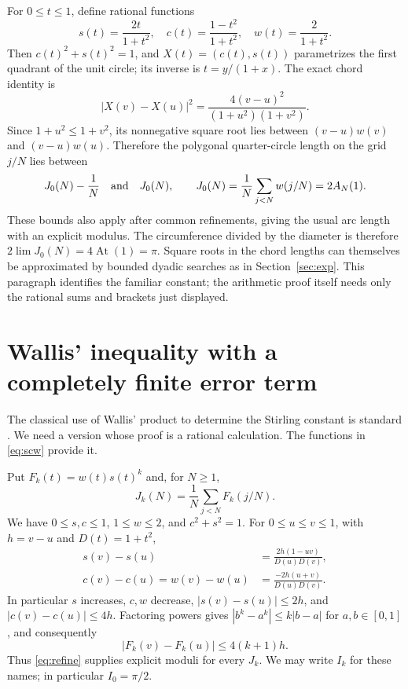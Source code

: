 \documentclass[11pt]{article}
\theoremstyle{definition}
\newcommand{\abs}[1]{\left|#1\right|}
\newcommand{\At}{\operatorname{At}}
\begin{document}
For $0\le t\le1$, define rational functions
\begin{equation}\label{eq:scw}
 s(t)=\frac{2t}{1+t^2},\quad
 c(t)=\frac{1-t^2}{1+t^2},\quad
 w(t)=\frac2{1+t^2}.
\end{equation}
Then $c(t)^2+s(t)^2=1$, and $X(t)=(c(t),s(t))$ parametrizes the
first quadrant of the unit circle; its inverse is $t=y/(1+x)$.
The exact chord identity is
\[
 \abs{X(v)-X(u)}^2
 =\frac{4(v-u)^2}{(1+u^2)(1+v^2)}.
\]
Since $1+u^2\le1+v^2$, its nonnegative square root lies between
$(v-u)w(v)$ and $(v-u)w(u)$. Therefore the polygonal quarter-circle
length on the grid $j/N$ lies between
\[
 J_0(N)-\frac1N\quad\hbox{and}\quad J_0(N),\qquad
 J_0(N)=\frac1N\sum_{j<N}w(j/N)=2A_N(1).
\]
These bounds also apply after common refinements, giving the usual arc
length with an explicit modulus. The circumference divided by the
diameter is therefore $2\lim J_0(N)=4\At(1)=\pi$.
Square roots in the chord lengths can themselves be approximated by
bounded dyadic searches as in Section~\ref{sec:exp}. This paragraph
identifies the familiar constant; the arithmetic proof itself needs only
the rational sums and brackets just displayed.

\section{Wallis' inequality with a completely finite error term}
\label{sec:wallis}

The classical use of Wallis' product to determine the Stirling constant is
standard \cite{Bruin}. We need a version whose proof is a rational
calculation. The functions in \eqref{eq:scw} provide it.

Put $F_k(t)=w(t)s(t)^k$ and, for $N\ge1$,
\begin{equation}\label{eq:J}
 J_k(N)=\frac1N\sum_{j<N}F_k(j/N).
\end{equation}
We have $0\le s,c\le1$, $1\le w\le2$, and $c^2+s^2=1$.
For $0\le u\le v\le1$, with $h=v-u$ and $D(t)=1+t^2$,
\begin{align}
 s(v)-s(u)&=\frac{2h(1-uv)}{D(u)D(v)},\label{eq:sinc}\\
 c(v)-c(u)=w(v)-w(u)&=\frac{-2h(u+v)}{D(u)D(v)}.\label{eq:cinc}
\end{align}
In particular $s$ increases, $c,w$ decrease, $\abs{s(v)-s(u)}\le2h$,
and $\abs{c(v)-c(u)}\le4h$. Factoring powers gives
$\abs{b^k-a^k}\le k\abs{b-a}$ for $a,b\in[0,1]$, and consequently
\[
 \abs{F_k(v)-F_k(u)}\le4(k+1)h.
\]
Thus \eqref{eq:refine} supplies explicit moduli for every $J_k$.
We may write $I_k$ for these names; in particular $I_0=\pi/2$.
\end{document}
